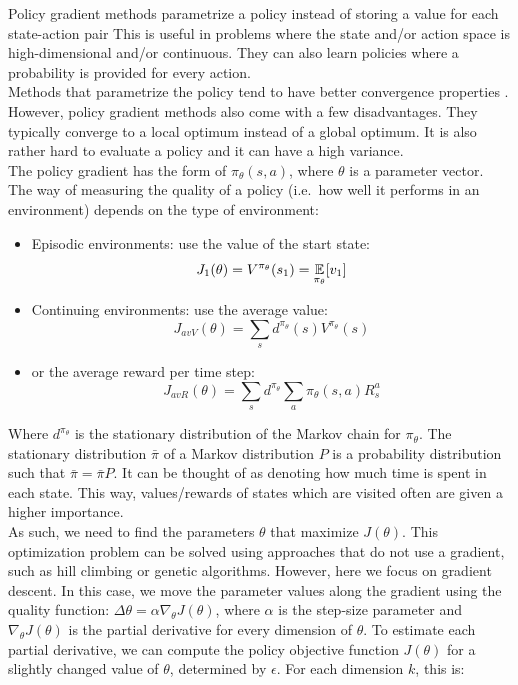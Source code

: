 Policy gradient methods parametrize a policy instead of storing a value for each state-action pair
This is useful in problems where the state and/or action space is high-dimensional and/or continuous. They can also learn policies where a probability is provided for every action.\\
Methods that parametrize the policy tend to have better convergence properties \parencite{Sutton1999PolicyApproximation}.
However, policy gradient methods also come with a few disadvantages. They typically converge to a local optimum instead of a global optimum. It is also rather hard to evaluate a policy and it can have a high variance.\\
The policy gradient has the form of $\pi_{\theta}(s,a)$, where $\theta$ is a parameter vector. The way of measuring the quality of a policy (i.e.\ how well it performs in an environment) depends on the type of environment:
\begin{itemize}
\item Episodic environments: use the value of the start state:
        \begin{equation}
            J_1(\theta) = V^{\pi_{\theta}}(s_1) = \operatorname*{\mathop{{}\mathbb{E}}}_{\pi_{\theta}} [v_1]
        \end{equation}
\item Continuing environments: use the average value:
        \begin{equation}
            J_{avV}(\theta) = \sum_s d^{\pi_{\theta}}(s)V^{\pi_{\theta}}(s)
        \end{equation}
\item or the average reward per time step:
        \begin{equation}
            J_{avR}(\theta) = \sum_s d^{\pi_{\theta}} \sum_a \pi_{\theta}(s,a) R_s^a
        \end{equation}
\end{itemize}
Where $d^{\pi_{\theta}}$ is the stationary distribution of the Markov chain for $\pi_{\theta}$. The stationary distribution $\bar{\pi}$ of a Markov distribution $P$ is a probability distribution such that $\bar{\pi} = \bar{\pi} P$. It can be thought of as denoting how much time is spent in each state. This way, values/rewards of states which are visited often are given a higher importance.\\
As such, we need to find the parameters $\theta$ that maximize $J(\theta)$. This optimization problem can be solved using approaches that do not use a gradient, such as hill climbing or genetic algorithms. However, here we focus on gradient descent. In this case, we move the parameter values along the gradient using the quality function: $\Delta \theta = \alpha \nabla_{\theta} J(\theta)$, where $\alpha$ is the step-size parameter and $\nabla_{\theta} J(\theta)$ is the partial derivative for every dimension of $\theta$. To estimate each partial derivative, we can compute the policy objective function $J(\theta)$ for a slightly changed value of $\theta$, determined by $\epsilon$. For each dimension $k$, this is:
